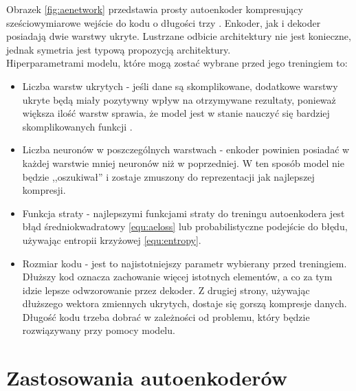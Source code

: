 \documentclass[a4paper,12pt,oneside]{book} %
\begin{document}
Obrazek \ref{fig:aenetwork} przedstawia prosty autoenkoder kompresujący sześciowymiarowe wejście do kodu o długości trzy \cite{tikzae}. Enkoder, jak i dekoder posiadają dwie warstwy ukryte. Lustrzane odbicie architektury nie jest konieczne, jednak symetria jest typową propozycją architektury.\\
Hiperparametrami modelu, które mogą zostać wybrane przed jego treningiem to:
\begin{itemize}
	\item Liczba warstw ukrytych - jeśli dane są skomplikowane, dodatkowe warstwy ukryte będą miały pozytywny wpływ na otrzymywane rezultaty, ponieważ większa ilość warstw sprawia, że model jest w stanie nauczyć się bardziej skomplikowanych funkcji \cite{telgarsky2016benefits, eldan2016power}.
	\item Liczba neuronów w poszczególnych warstwach - enkoder powinien posiadać w każdej warstwie mniej neuronów niż w poprzedniej. W ten sposób model nie będzie ,,oszukiwał'' i zostaje zmuszony do reprezentacji jak najlepszej kompresji.
	\item Funkcja straty - najlepszymi funkcjami straty do treningu autoenkodera jest błąd średniokwadratowy \ref{equ:aeloss} lub probabilistyczne podejście do błędu, używając entropii krzyżowej \ref{equ:entropy}.
	\item Rozmiar kodu - jest to najistotniejszy parametr wybierany przed treningiem. Dłuższy kod oznacza zachowanie więcej istotnych elementów, a co za tym idzie lepsze odwzorowanie przez dekoder. Z drugiej strony, używając dłuższego wektora zmiennych ukrytych, dostaje się gorszą kompresje danych. Długość kodu trzeba dobrać w zależności od problemu, który będzie rozwiązywany przy pomocy modelu.
\end{itemize}
\section{Zastosowania autoenkoderów}
\end{document}
